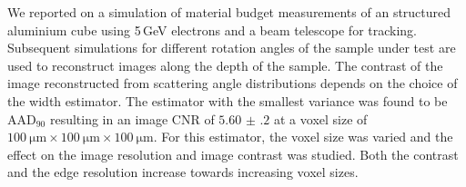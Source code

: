 \documentclass{PoS}
\newcommand{\aadninety}{\ensuremath{\textrm{AAD}_\textrm{90}}}
\begin{document}
We reported on a simulation of material budget measurements of an structured aluminium cube using 5\,GeV electrons and a beam telescope for tracking. 
Subsequent simulations for different rotation angles of the sample under test are used to reconstruct images along the depth of the sample. 
The contrast of the image reconstructed from scattering angle distributions depends on the choice of the width estimator. 
The estimator with the smallest variance was found to be $\aadninety$ resulting in an image CNR of $\num{5.60(20)}$ at a voxel size of $\SI{100}{\um} \times \SI{100}{\um} \times \SI{100}{\um}$.
For this estimator, the voxel size was varied and the effect on the image resolution and image contrast was studied.
Both the contrast and the edge resolution increase towards increasing voxel sizes. 






\end{document}
